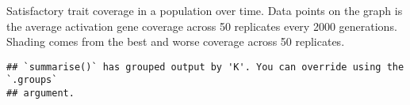 \documentclass[]{book}
\newenvironment{Shaded}{\begin{snugshade}}{\end{snugshade}}
\newcommand{\DataTypeTok}[1]{\textcolor[rgb]{0.13,0.29,0.53}{#1}}
\newcommand{\KeywordTok}[1]{\textcolor[rgb]{0.13,0.29,0.53}{\textbf{#1}}}
\newcommand{\NormalTok}[1]{#1}
\newcommand{\OperatorTok}[1]{\textcolor[rgb]{0.81,0.36,0.00}{\textbf{#1}}}
\newcommand{\StringTok}[1]{\textcolor[rgb]{0.31,0.60,0.02}{#1}}
\begin{document}
Satisfactory trait coverage in a population over time.
Data points on the graph is the average activation gene coverage across 50 replicates every 2000 generations.
Shading comes from the best and worse coverage across 50 replicates.

\begin{Shaded}
\end{Shaded}

\begin{verbatim}
## `summarise()` has grouped output by 'K'. You can override using the `.groups`
## argument.
\end{verbatim}
\end{document}
